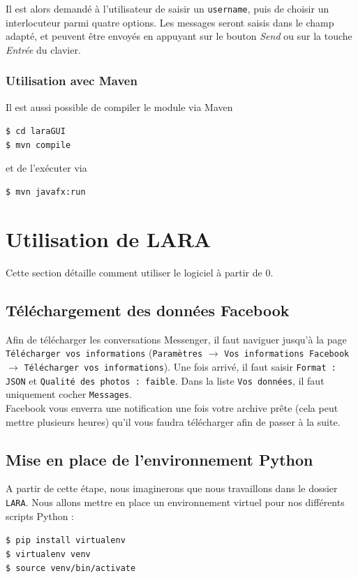 \documentclass[10pt,a4paper]{article}
\newcommand\tab[1][0.5cm]{\hspace*{#1}}
\begin{document}
Il est alors demandé à l'utilisateur de saisir un \texttt{username}, puis de choisir un interlocuteur parmi quatre options. Les messages seront saisis dans le champ adapté, et peuvent être envoyés en appuyant sur le bouton \textit{Send} ou sur la touche \textit{Entrée} du clavier.

\subsubsection{Utilisation avec Maven}
Il est aussi possible de compiler le module via Maven
\begin{center}
	\texttt{\$ cd laraGUI} \\
	\texttt{\$ mvn compile}
\end{center}
et de l'exécuter via
\begin{center}
	\texttt{\$ mvn javafx:run}
\end{center}


\section{Utilisation de LARA}
Cette section détaille comment utiliser le logiciel à partir de 0.
\subsection{Téléchargement des données Facebook}
Afin de télécharger les conversations Messenger, il faut naviguer jusqu'à la page \texttt{Télécharger vos informations} (\texttt{Paramètres} $\longrightarrow$ \texttt{Vos informations Facebook} $\longrightarrow$ \texttt{Télécharger vos informations}). Une fois arrivé, il faut saisir \texttt{Format : JSON} et \texttt{Qualité des photos : faible}. Dans la liste \texttt{Vos données}, il faut uniquement cocher \texttt{Messages}. \\
\tab Facebook vous enverra une notification une fois votre archive prête (cela peut mettre plusieurs heures) qu'il vous faudra télécharger afin de passer à la suite.
\subsection{Mise en place de l'environnement Python}
A partir de cette étape, nous imaginerons que nous travaillons dans le dossier \texttt{LARA}. Nous allons mettre en place un environnement virtuel pour nos différents scripts Python :
\begin{center}
	\texttt{\$ pip install virtualenv} \\
	\texttt{\$ virtualenv venv} \\
	\texttt{\$ source venv/bin/activate}
\end{center}
\end{document}

